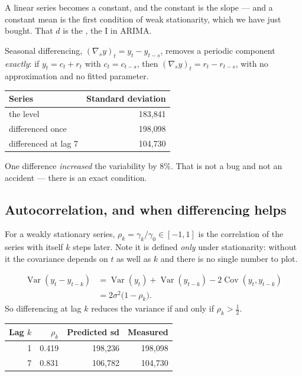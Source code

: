 \documentclass[11pt,a4paper]{article}
\begin{document}
A linear series becomes a constant, and the constant is the slope --- and a
constant mean is the first condition of weak stationarity, which we have just
bought. That $d$ is the , the I in ARIMA.

Seasonal differencing, $(\nabla_s y)_t = y_t - y_{t-s}$, removes a periodic
component \emph{exactly}: if $y_t = c_t + r_t$ with $c_t = c_{t-s}$, then
$(\nabla_s y)_t = r_t - r_{t-s}$, with no approximation and no fitted
parameter.

\begin{center}
\small
\begin{tabular}{lr}
\toprule
\textbf{Series} & \textbf{Standard deviation} \\
\midrule
the level & 183{,}841 \\
differenced once & 198{,}098 \\
differenced at lag 7 & 104{,}730 \\
\bottomrule
\end{tabular}
\end{center}

One difference \emph{increased} the variability by 8\%. That is not a bug and
not an accident --- there is an exact condition.

\subsection{Autocorrelation, and when differencing helps}

For a weakly stationary series,
$\rho_k = \gamma_k/\gamma_0 \in [-1,1]$ is the correlation of the series with
itself $k$ steps later. Note it is defined \emph{only} under stationarity:
without it the covariance depends on $t$ as well as $k$ and there is no single
number to plot.

\begin{derivbox}[title={The variance of a lag-$k$ difference}]
\[
\begin{aligned}
\operatorname{Var}(y_t - y_{t-k})
 &= \operatorname{Var}(y_t) + \operatorname{Var}(y_{t-k})
   - 2\operatorname{Cov}(y_t, y_{t-k}) \\
 &= 2\sigma^{2}\bigl(1 - \rho_k\bigr).
\end{aligned}
\]
So differencing at lag $k$ reduces the variance if and only if
$\rho_k > \tfrac12$.
\end{derivbox}

\begin{center}
\small
\begin{tabular}{rrrr}
\toprule
\textbf{Lag $k$} & $\rho_k$ & \textbf{Predicted sd} & \textbf{Measured} \\
\midrule
1 & 0.419 & 198{,}236 & 198{,}098 \\
7 & 0.831 & 106{,}782 & 104{,}730 \\
\bottomrule
\end{tabular}
\end{center}
\end{document}
